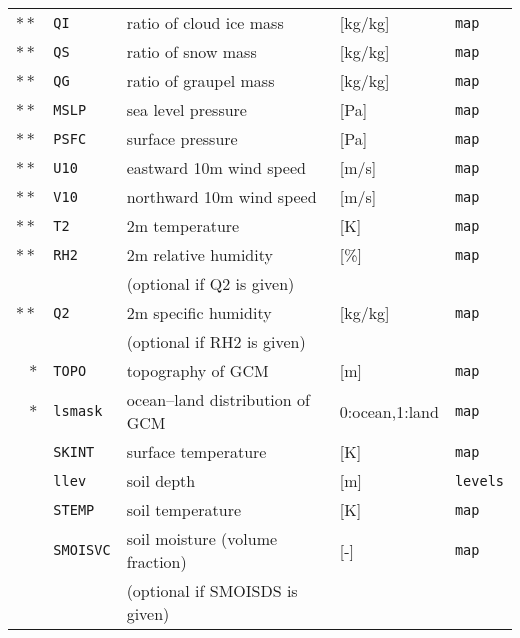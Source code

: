 {\begin{table}[bth]
\begin{center}
\begin{tabularx}{150mm}{rl|l|l|l}
$\ast\ast$ &\verb|QI|      & ratio of cloud ice mass          & [kg/kg]        & \verb|map|         \\
$\ast\ast$ &\verb|QS|      & ratio of snow mass               & [kg/kg]        & \verb|map|         \\
$\ast\ast$ &\verb|QG|      & ratio of graupel mass            & [kg/kg]        & \verb|map|         \\
$\ast\ast$ &\verb|MSLP|    & sea level pressure               & [Pa]           & \verb|map|         \\
$\ast\ast$ &\verb|PSFC|    & surface pressure                 & [Pa]           & \verb|map|         \\
$\ast\ast$ &\verb|U10|     & eastward 10m wind speed          & [m/s]          & \verb|map|         \\
$\ast\ast$ &\verb|V10|     & northward 10m wind speed         & [m/s]          & \verb|map|         \\
$\ast\ast$ &\verb|T2|      & 2m temperature                   & [K]            & \verb|map|         \\
$\ast\ast$ &\verb|RH2|     & 2m relative humidity             & [\%]           & \verb|map|         \\
           &               & (optional if Q2 is given)        &                &                    \\
$\ast\ast$ &\verb|Q2|      & 2m specific humidity             & [kg/kg]        & \verb|map|         \\
           &               & (optional if RH2 is given)       &                &                    \\
    $\ast$ &\verb|TOPO|    & topography of GCM                & [m]            & \verb|map|         \\
    $\ast$ &\verb|lsmask|  & ocean--land distribution of GCM  & 0:ocean,1:land & \verb|map|         \\
           &\verb|SKINT|   & surface temperature              & [K]            & \verb|map|         \\
           &\verb|llev|    & soil depth                       & [m]            & \verb|levels|      \\
           &\verb|STEMP|   & soil temperature                 & [K]            & \verb|map|         \\
           &\verb|SMOISVC| & soil moisture (volume fraction)  & [-]            & \verb|map|         \\
           &               & (optional if SMOISDS is given)   &                &                    \\

\end{tabularx}
\end{center}
\end{table}}
